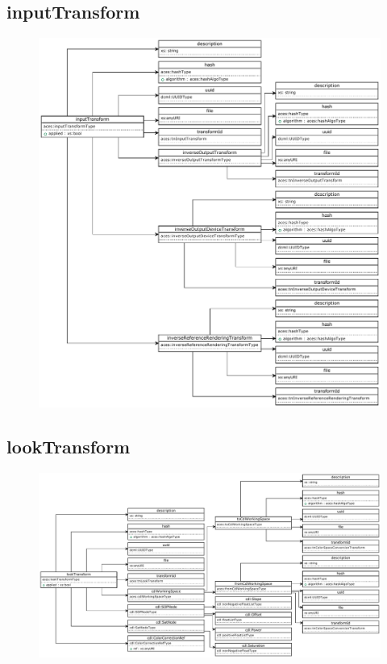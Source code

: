 \subsection{inputTransform}
\begin{figure}[H]
  \centering
  \includegraphics[width=\textwidth]{./uml_diagrams/uml_inputTransform.pdf}
\end{figure}

\subsection{lookTransform}
\begin{figure}[H]
  \centering
  \includegraphics[width=\textwidth]{./uml_diagrams/uml_lookTransform.pdf}
\end{figure}

